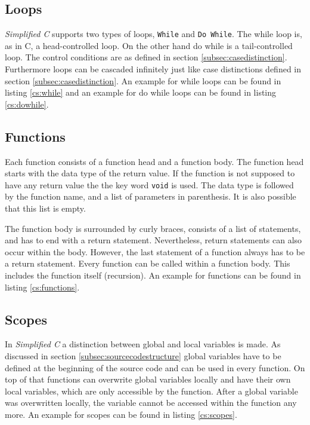 \documentclass[12pt,a4paper,titlepage,oneside,final]{article}
\begin{document}


\subsection{Loops}
\emph{Simplified C} supports two types of loops, \texttt{While} and \texttt{Do While}. The while loop is, as in C, a head-controlled loop. On the other hand do while is a tail-controlled loop. The control conditions are as defined in section \vref{subsec:casedistinction}. Furthermore loops can be cascaded infinitely just like case distinctions defined in section \vref{subsec:casedistinction}. An example for while loops can be found in listing \vref{cs:while} and an example for do while loops can be found in listing \vref{cs:dowhile}.





\subsection{Functions}
Each function consists of a function head and a function body. The function head starts with the data type of the return value. If the function is not supposed to have any return value the the key word \texttt{void} is used. The data type is followed by the function name, and a list of parameters in parenthesis. It is also possible that this list is empty.

The function body is surrounded by curly braces, consists of a list of statements, and has to end with a return statement. Nevertheless, return statements can also occur within the body. However, the last statement of a function always has to be a return statement. Every function can be called within a function body. This includes the function itself (recursion). An example for functions can be found in listing \vref{cs:functions}.



\subsection{Scopes}
In \emph{Simplified C} a distinction between global and local variables is made. As discussed in section \vref{subsec:sourcecodestructure} global variables have to be defined at the beginning of the source code and can be used in every function. On top of that functions can overwrite global variables locally and have their own local variables, which are only accessible by the function. After a global variable was overwritten locally, the variable cannot be accessed within the function any more. An example for scopes can be found in listing \vref{cs:scopes}.
\end{document}

